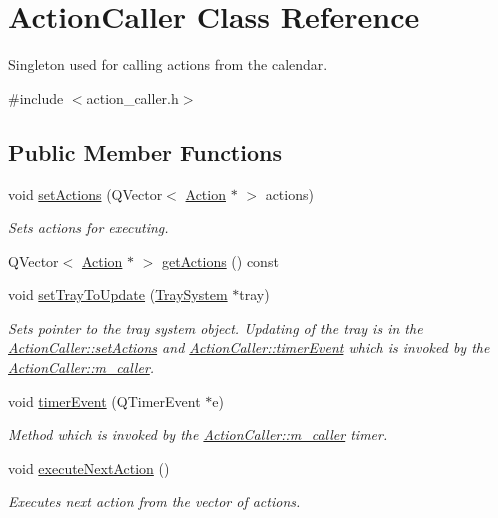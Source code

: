 \hypertarget{class_action_caller}{\section{Action\-Caller Class Reference}
\label{class_action_caller}
}


Singleton used for calling actions from the calendar.  




{\ttfamily \#include $<$action\-\_\-caller.\-h$>$}

\subsection*{Public Member Functions}
\begin{DoxyCompactItemize}
\item 
void \hyperlink{class_action_caller_ae05e223ea1a75f49b694654a2e3267a2}{set\-Actions} (Q\-Vector$<$ \hyperlink{class_action}{Action} $\ast$ $>$ actions)
\begin{DoxyCompactList}\small\item\em Sets actions for executing. \end{DoxyCompactList}\item 
Q\-Vector$<$ \hyperlink{class_action}{Action} $\ast$ $>$ \hyperlink{class_action_caller_a4130795357a38f6ff4034f267a5c1ab0}{get\-Actions} () const 
\item 
void \hyperlink{class_action_caller_a471b5f266088338d8e7ef6e598316940}{set\-Tray\-To\-Update} (\hyperlink{class_tray_system}{Tray\-System} $\ast$tray)
\begin{DoxyCompactList}\small\item\em Sets pointer to the tray system object. Updating of the tray is in the \hyperlink{class_action_caller_ae05e223ea1a75f49b694654a2e3267a2}{Action\-Caller\-::set\-Actions} and \hyperlink{class_action_caller_ab30b9963ae7b590d89aa0c12c01e8648}{Action\-Caller\-::timer\-Event} which is invoked by the \hyperlink{class_action_caller_ae5f4d1fd24c21f19f69d4fc40339ce26}{Action\-Caller\-::m\-\_\-caller}. \end{DoxyCompactList}\item 
void \hyperlink{class_action_caller_ab30b9963ae7b590d89aa0c12c01e8648}{timer\-Event} (Q\-Timer\-Event $\ast$e)
\begin{DoxyCompactList}\small\item\em Method which is invoked by the \hyperlink{class_action_caller_ae5f4d1fd24c21f19f69d4fc40339ce26}{Action\-Caller\-::m\-\_\-caller} timer. \end{DoxyCompactList}\item 
void \hyperlink{class_action_caller_a4ffffa40b0fb64880184b746a150bbb1}{execute\-Next\-Action} ()
\begin{DoxyCompactList}\small\item\em Executes next action from the vector of actions. \end{DoxyCompactList}\end{DoxyCompactItemize}
